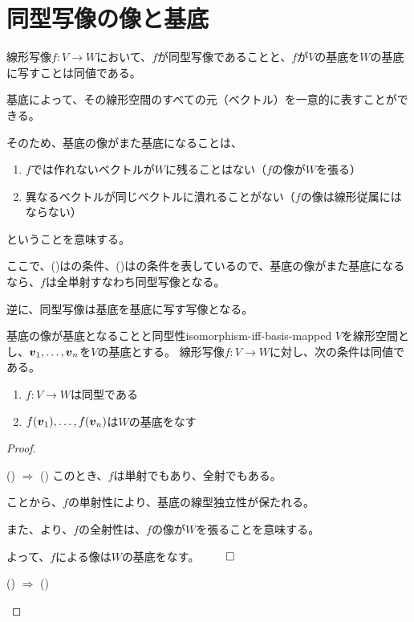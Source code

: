 \documentclass[../../../topic_linear-algebra]{subfiles}
\begin{document}
\sectionline
\section{同型写像の像と基底}

線形写像$f\colon V \to W$において、$f$が同型写像であることと、$f$が$V$の基底を$W$の基底に写すことは同値である。

\br

基底によって、その線形空間のすべての元（ベクトル）を一意的に表すことができる。

そのため、基底の像がまた基底になることは、
\begin{enumerate}[label=\romanlabel]
  \item $f$では作れないベクトルが$W$に残ることはない（$f$の像が$W$を張る）
  \item 異なるベクトルが同じベクトルに潰れることがない（$f$の像は線形従属にはならない）
\end{enumerate}
ということを意味する。

ここで、()はの条件、()はの条件を表しているので、基底の像がまた基底になるなら、$f$は全単射すなわち同型写像となる。

\br

逆に、同型写像は基底を基底に写す写像となる。

\begin{theorem}{基底の像が基底となることと同型性}{isomorphism-iff-basis-mapped}
  $V$を線形空間とし、$\vb*{v}_1, \ldots, \vb*{v}_n$を$V$の基底とする。
  線形写像$f \colon V \to W$に対し、次の条件は同値である。
  \begin{enumerate}[label=\romanlabel]
    \item $f\colon V \to W$は同型である
    \item $f(\vb*{v}_1), \ldots, f(\vb*{v}_n)$は$W$の基底をなす
  \end{enumerate}
\end{theorem}

\begin{proof}
  \begin{subpattern}{() $\Longrightarrow$ ()}
    このとき、$f$は単射でもあり、全射でもある。
    
    ことから、$f$の単射性により、基底の線型独立性が保たれる。

    また、より、$f$の全射性は、$f$の像が$W$を張ることを意味する。

    よって、$f$による像は$W$の基底をなす。 $\qed$
  \end{subpattern}
  
  \begin{subpattern}{() $\Longrightarrow$ ()}
    \todo{}
  \end{subpattern}
\end{proof}
\end{document}
